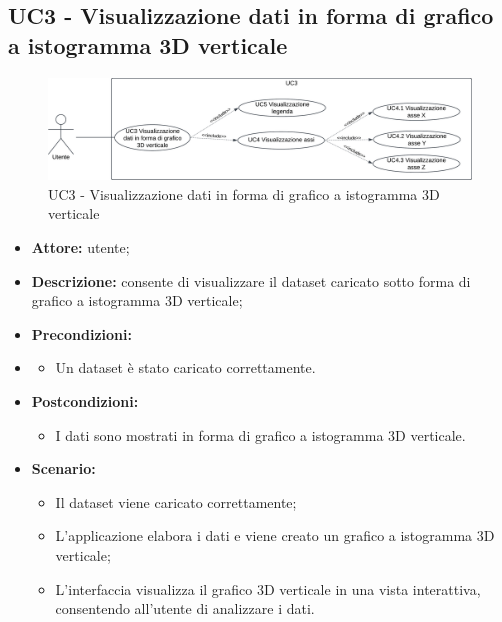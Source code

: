 \subsection{UC3 - Visualizzazione dati in forma di grafico a istogramma 3D verticale}
\begin{figure}[h!]
    \centering
    \includegraphics[scale=0.7]{template/images/UC3.png}
    \caption{UC3 - Visualizzazione dati in forma di grafico a istogramma 3D verticale}
\end{figure}
\begin{itemize}
    \item \textbf{Attore:} utente;
    \item \textbf{Descrizione:} consente di visualizzare il dataset caricato sotto forma di grafico a istogramma 3D verticale;
    \item \textbf{Precondizioni:}
    \item \begin{itemize}
        \item Un dataset è stato caricato correttamente.
    \end{itemize}
    \item \textbf{Postcondizioni:}
    \begin{itemize}
        \item I dati sono mostrati in forma di grafico a istogramma 3D verticale.
    \end{itemize}
    \item \textbf{Scenario:}
    \begin{itemize}
        \item Il dataset viene caricato correttamente;
        \item L'applicazione elabora i dati e viene creato un grafico a istogramma 3D verticale;
        \item L'interfaccia visualizza il grafico 3D verticale in una vista interattiva, consentendo all'utente di analizzare i dati.
    \end{itemize}
\end{itemize}
